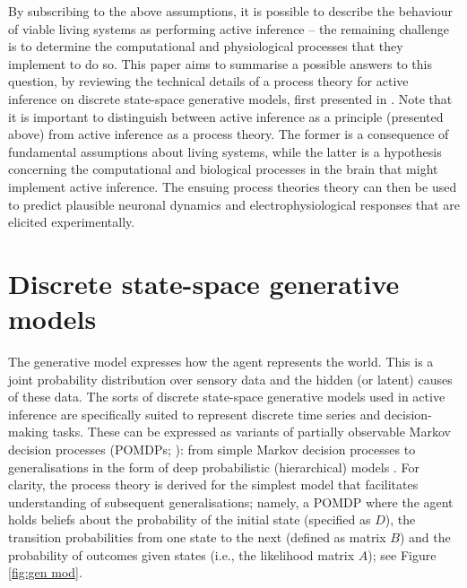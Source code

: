 \documentclass[review,12pt,authoryear]{elsarticle}
\begin{document}
By subscribing to the above assumptions, it is possible to describe the behaviour of viable living systems as performing active inference -- the remaining challenge is to determine the computational and physiological processes that they implement to do so. This paper aims to summarise a possible answers to this question, by reviewing the technical details of a process theory for active inference on discrete state-space generative models, first presented in \citep{fristonActiveInferenceProcess2017}. Note that it is important to distinguish between active inference as a principle (presented above) from active inference as a process theory. The former is a consequence of fundamental assumptions about living systems, while the latter is a hypothesis concerning the computational and biological processes in the brain that might implement active inference. The ensuing process theories theory can then be used to predict plausible neuronal dynamics and electrophysiological responses that are elicited experimentally.

\section{Discrete state-space generative models}

The generative model \citep{bishopPatternRecognitionMachine2006} expresses how the agent represents the world. This is a joint probability distribution over sensory data and the hidden (or latent) causes of these data. The sorts of discrete state-space generative models used in active inference are specifically suited to represent discrete time series and decision-making tasks. These can be expressed as variants of partially observable Markov decision processes (POMDPs; \citep{astromOptimalControlMarkov1965}): from simple Markov decision processes \citep{bartoReinforcementLearningIntroduction1992,stoneArtificialIntelligenceEngines2019,whiteMarkovDecisionProcesses2001} to generalisations in the form of deep probabilistic (hierarchical) models \citep{fristonDeepTemporalModels2018,boxMultiparameterProblemsBayesian1965,allenbyHierarchicalBayesModels2005}. For clarity, the process theory is derived for the simplest model that facilitates understanding of subsequent generalisations; namely, a POMDP where the agent holds beliefs about the probability of the initial state (specified as $D$), the transition probabilities from one state to the next (defined as matrix $B$) and the probability of outcomes given states (i.e., the likelihood matrix $A$); see Figure \ref{fig:gen mod}.
\end{document}
